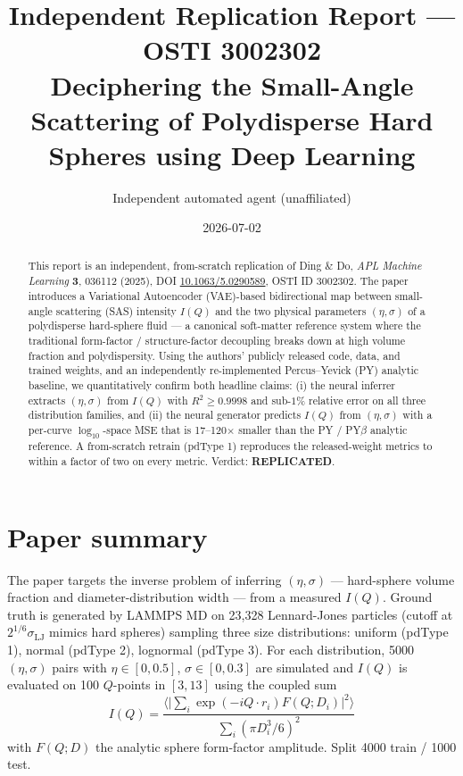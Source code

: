 \documentclass[11pt]{article}
\title{Independent Replication Report --- OSTI 3002302\\
\large Deciphering the Small-Angle Scattering of Polydisperse Hard Spheres
using Deep Learning}
\author{Independent automated agent (unaffiliated)}
\date{2026-07-02}
\begin{document}
\maketitle

\begin{abstract}
This report is an independent, from-scratch replication of Ding \& Do,
\emph{APL Machine Learning} \textbf{3}, 036112 (2025), DOI
\href{https://doi.org/10.1063/5.0290589}{10.1063/5.0290589}, OSTI ID
3002302. The paper introduces a Variational Autoencoder (VAE)-based
bidirectional map between small-angle scattering (SAS) intensity $I(Q)$ and
the two physical parameters $(\eta,\sigma)$ of a polydisperse hard-sphere
fluid --- a canonical soft-matter reference system where the traditional
form-factor / structure-factor decoupling breaks down at high volume
fraction and polydispersity. Using the authors' publicly released code,
data, and trained weights, and an independently re-implemented
Percus--Yevick (PY) analytic baseline, we quantitatively confirm both
headline claims: (i) the neural inferrer extracts $(\eta,\sigma)$ from
$I(Q)$ with $R^2\!\ge\!0.9998$ and sub-$1\%$ relative error on all three
distribution families, and (ii) the neural generator predicts $I(Q)$ from
$(\eta,\sigma)$ with a per-curve $\log_{10}$-space MSE that is
17--120$\times$ smaller than the PY / PY$\beta$ analytic reference. A
from-scratch retrain (pdType 1) reproduces the released-weight metrics to
within a factor of two on every metric. Verdict: \textbf{REPLICATED}.
\end{abstract}

\section{Paper summary}
The paper targets the inverse problem of inferring $(\eta,\sigma)$ ---
hard-sphere volume fraction and diameter-distribution width --- from a
measured $I(Q)$. Ground truth is generated by LAMMPS MD on 23{,}328
Lennard-Jones particles (cutoff at $2^{1/6}\sigma_\mathrm{LJ}$ mimics hard
spheres) sampling three size distributions: uniform (pdType 1), normal
(pdType 2), lognormal (pdType 3). For each distribution, 5000
$(\eta,\sigma)$ pairs with $\eta\!\in\![0,0.5]$, $\sigma\!\in\![0,0.3]$ are
simulated and $I(Q)$ is evaluated on 100 $Q$-points in $[3,13]$ using the
coupled sum
\begin{equation}
I(Q) = \frac{\bigl\langle \bigl|\sum_i \exp(-iQ\cdot r_i) F(Q;D_i)\bigr|^2\bigr\rangle}
             {\sum_i (\pi D_i^3 / 6)^2}
             \label{eq:iq}
\end{equation}
with $F(Q;D)$ the analytic sphere form-factor amplitude. Split
4000 train / 1000 test.
\end{document}
